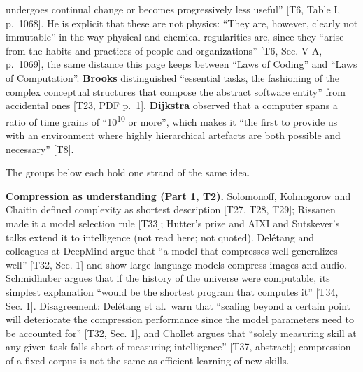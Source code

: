 \documentclass[10pt,letterpaper]{article}
\begin{document}
\begin{itemize}
  undergoes continual change or becomes progressively less useful''
  {[}T6, Table I, p.~1068{]}. He is explicit that these are not physics:
  ``They are, however, clearly not immutable'' in the way physical and
  chemical regularities are, since they ``arise from the habits and
  practices of people and organizations'' {[}T6, Sec. V-A, p.~1069{]},
  the same distance this page keeps between ``Laws of Coding'' and
  ``Laws of Computation''. \textbf{Brooks} distinguished ``essential
  tasks, the fashioning of the complex conceptual structures that
  compose the abstract software entity'' from accidental ones {[}T23,
  PDF p.~1{]}. \textbf{Dijkstra} observed that a computer spans a ratio
  of time grains of ``10\textsuperscript{10} or more'', which makes it
  ``the first to provide us with an environment where highly
  hierarchical artefacts are both possible and necessary'' {[}T8{]}.
\end{itemize}

The groups below each hold one strand of the same idea.

\textbf{Compression as understanding (Part 1, T2).} Solomonoff,
Kolmogorov and Chaitin defined complexity as shortest description
{[}T27, T28, T29{]}; Rissanen made it a model selection rule {[}T33{]};
Hutter's prize and AIXI and Sutskever's talks extend it to intelligence
(not read here; not quoted). Delétang and colleagues at DeepMind argue
that ``a model that compresses well generalizes well'' {[}T32, Sec. 1{]}
and show large language models compress images and audio. Schmidhuber
argues that if the history of the universe were computable, its simplest
explanation ``would be the shortest program that computes it'' {[}T34,
Sec. 1{]}. Disagreement: Delétang et al.~warn that ``scaling beyond a
certain point will deteriorate the compression performance since the
model parameters need to be accounted for'' {[}T32, Sec. 1{]}, and
Chollet argues that ``solely measuring skill at any given task falls
short of measuring intelligence'' {[}T37, abstract{]}; compression of a
fixed corpus is not the same as efficient learning of new skills.
\end{document}
